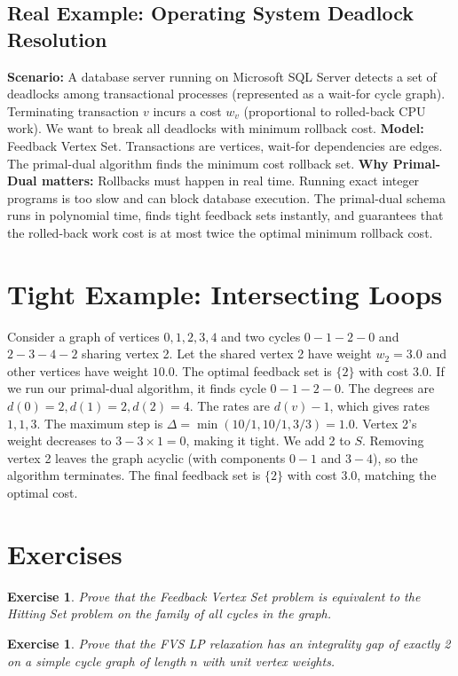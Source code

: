 \documentclass[11pt,oneside]{book}
\newtheorem{exercise}[theorem]{Exercise}
\begin{document}
\subsection*{Real Example: Operating System Deadlock Resolution}
\textbf{Scenario:} A database server running on Microsoft SQL Server detects a set of deadlocks among transactional processes (represented as a wait-for cycle graph). Terminating transaction $v$ incurs a cost $w_v$ (proportional to rolled-back CPU work). We want to break all deadlocks with minimum rollback cost.
\textbf{Model:} Feedback Vertex Set. Transactions are vertices, wait-for dependencies are edges. The primal-dual algorithm finds the minimum cost rollback set.
\textbf{Why Primal-Dual matters:} Rollbacks must happen in real time. Running exact integer programs is too slow and can block database execution. The primal-dual schema runs in polynomial time, finds tight feedback sets instantly, and guarantees that the rolled-back work cost is at most twice the optimal minimum rollback cost.

\section{Tight Example: Intersecting Loops}
Consider a graph of vertices $0, 1, 2, 3, 4$ and two cycles $0-1-2-0$ and $2-3-4-2$ sharing vertex 2. Let the shared vertex 2 have weight $w_2 = 3.0$ and other vertices have weight $10.0$.
The optimal feedback set is $\{2\}$ with cost 3.0.
If we run our primal-dual algorithm, it finds cycle $0-1-2-0$. The degrees are $d(0)=2, d(1)=2, d(2)=4$. The rates are $d(v)-1$, which gives rates $1, 1, 3$.
The maximum step is $\Delta = \min(10/1, 10/1, 3/3) = 1.0$.
Vertex 2's weight decreases to $3 - 3 \times 1 = 0$, making it tight. We add 2 to $S$.
Removing vertex 2 leaves the graph acyclic (with components $0-1$ and $3-4$), so the algorithm terminates.
The final feedback set is $\{2\}$ with cost 3.0, matching the optimal cost.

\section{Exercises}
\begin{exercise}
Prove that the Feedback Vertex Set problem is equivalent to the Hitting Set problem on the family of all cycles in the graph.
\end{exercise}
\begin{exercise}
Prove that the FVS LP relaxation has an integrality gap of exactly 2 on a simple cycle graph of length $n$ with unit vertex weights.
\end{exercise}
\end{document}
